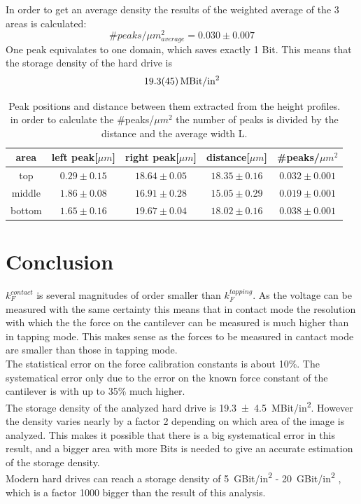 \documentclass[%
 reprint,
amsmath,amssymb,
pra,
]{revtex4-1}
\begin{document}
In order to get an average density the results of the weighted average of the 3 areas is calculated:
\begin{equation*}
\#peaks/\mu m^2_{average} = 0.030 \pm 0.007
\end{equation*}
One peak equivalates to one domain, which saves exactly 1 Bit. This means that the storage density of the hard drive is
\begin{equation*}
\SI{19.3\pm 4.5}{MBit/in^2}
\end{equation*}





\begin{table}[h]
\centering
\begin{tabular}{|c|c|c|c|c|}
\hline 
area & left peak[$\mu m$] & right peak[$\mu m$] & distance[$\mu m$] & \#peaks/$\mu m^2$ \\ 
\hline 
top & $0.29 \pm 0.15$ & $18.64 \pm 0.05$ & $18.35 \pm 0.16$ & $0.032 \pm 0.001$\\ 
\hline
middle & $1.86 \pm 0.08$ & $16.91 \pm 0.28$ & $15.05 \pm 0.29$ & $0.019 \pm 0.001$\\ 
\hline
bottom & $1.65 \pm 0.16$ & $19.67 \pm 0.04$ & $18.02 \pm 0.16$ & $0.038 \pm 0.001$\\ 
\hline
\end{tabular} 
\caption{Peak positions and distance between them extracted from the height profiles. in order to calculate the \#peaks/$\mu m^2$ the number of peaks is divided by the distance and the average width L.}
\label{tab:magnetic_peaks}
\end{table}



\section{Conclusion}
$k_F^{contact}$ is several magnitudes of order smaller than $k_F^{tapping}$. As the voltage can be measured with the same certainty this means that in contact mode the resolution with which the the force on the cantilever can be measured is much higher than in tapping mode. This makes sense as the forces to be measured in cantact mode are smaller than those in tapping mode. \\
The statistical error on the force calibration constants is about 10\%. The systematical error only due to the error on the known force constant of the cantilever is with up to 35\% much higher. 
\\
The storage density of the analyzed hard drive is \SI{19.3\pm 4.5}{MBit/in^2}. However the density varies nearly by a factor 2 depending on which area of the image is analyzed. This makes it possible that there is a big systematical error in this result, and a bigger area with more Bits is needed to give an accurate estimation of the storage density.\\
Modern hard drives can reach a storage density of \SI{5}{GBit/in^2} - \SI{20}{GBit/in^2} \cite{Loss98}, which is a factor 1000 bigger than the result of this analysis.







\end{document}
